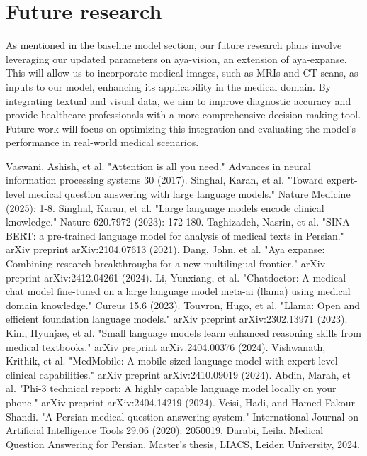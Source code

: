 \documentclass[conference]{IEEEtran}
\begin{document}
\section*{Future research}
As mentioned in the baseline model section, our future research plans involve leveraging our updated parameters on aya-vision, an extension of aya-expanse. This will allow us to incorporate medical images, such as MRIs and CT scans, as inputs to our model, enhancing its applicability in the medical domain. By integrating textual and visual data, we aim to improve diagnostic accuracy and provide healthcare professionals with a more comprehensive decision-making tool. Future work will focus on optimizing this integration and evaluating the model’s performance in real-world medical scenarios.


\begin{thebibliography}{00}
Vaswani, Ashish, et al. "Attention is all you need." Advances in neural information processing systems 30 (2017).
Singhal, Karan, et al. "Toward expert-level medical question answering with large language models." Nature Medicine (2025): 1-8.
Singhal, Karan, et al. "Large language models encode clinical knowledge." Nature 620.7972 (2023): 172-180.
Taghizadeh, Nasrin, et al. "SINA-BERT: a pre-trained language model for analysis of medical texts in Persian." arXiv preprint arXiv:2104.07613 (2021).
Dang, John, et al. "Aya expanse: Combining research breakthroughs for a new multilingual frontier." arXiv preprint arXiv:2412.04261 (2024).
Li, Yunxiang, et al. "Chatdoctor: A medical chat model fine-tuned on a large language model meta-ai (llama) using medical domain knowledge." Cureus 15.6 (2023).
Touvron, Hugo, et al. "Llama: Open and efficient foundation language models." arXiv preprint arXiv:2302.13971 (2023).
Kim, Hyunjae, et al. "Small language models learn enhanced reasoning skills from medical textbooks." arXiv preprint arXiv:2404.00376 (2024).
Vishwanath, Krithik, et al. "MedMobile: A mobile-sized language model with expert-level clinical capabilities." arXiv preprint arXiv:2410.09019 (2024).
Abdin, Marah, et al. "Phi-3 technical report: A highly capable language model locally on your phone." 
arXiv preprint arXiv:2404.14219 (2024).
Veisi, Hadi, and Hamed Fakour Shandi. "A Persian medical question answering system." International Journal on Artificial Intelligence Tools 29.06 (2020): 2050019. 
Darabi, Leila. Medical Question Answering for Persian. Master’s thesis, LIACS, Leiden University, 2024.

\end{thebibliography}
\end{document}
